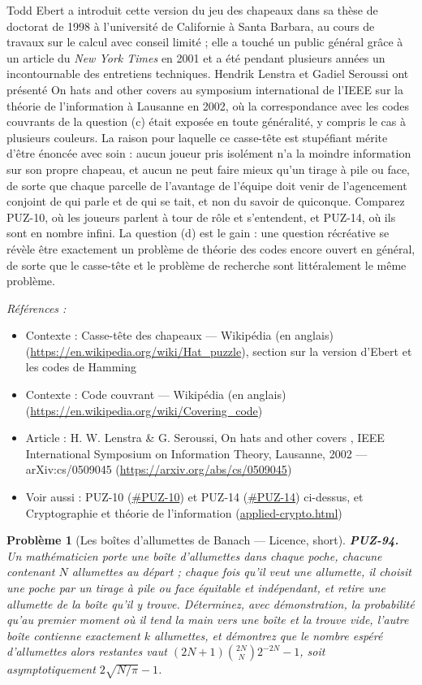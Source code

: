 \documentclass[11pt]{article}
\newtheorem{problem}{Problème}
\newenvironment{refs}{\par\small\noindent\emph{Références :}\begin{itemize}\setlength\itemsep{0pt}}{\end{itemize}\normalsize}
\begin{document}
\noindent Todd Ebert a introduit cette version du jeu des chapeaux dans sa thèse de
doctorat de 1998 à l'université de Californie à Santa Barbara, au cours de travaux sur le
calcul avec conseil limité ; elle a touché un public général grâce à un article du \textit{New
York Times} en 2001 et a été pendant plusieurs années un incontournable des entretiens
techniques. Hendrik Lenstra et Gadiel Seroussi ont présenté \og{} On hats and other covers \fg{} au
symposium international de l'IEEE sur la théorie de l'information à Lausanne en 2002, où la
correspondance avec les codes couvrants de la question (c) était exposée en toute généralité,
y compris le cas à plusieurs couleurs. La raison pour laquelle ce casse-tête est stupéfiant
mérite d'être énoncée avec soin : aucun joueur pris isolément n'a la moindre information sur
son propre chapeau, et aucun ne peut faire mieux qu'un tirage à pile ou face, de sorte que
chaque parcelle de l'avantage de l'équipe doit venir de l'agencement conjoint de qui parle et
de qui se tait, et non du savoir de quiconque. Comparez PUZ-10, où les joueurs parlent à tour
de rôle et s'entendent, et PUZ-14, où ils sont en nombre infini. La question (d) est le
gain : une question récréative se révèle être exactement un problème de théorie des codes
encore ouvert en général, de sorte que le casse-tête et le problème de recherche sont
littéralement le même problème.

\begin{refs}
\item Contexte : Casse-tête des chapeaux --- Wikipédia (en anglais) (\url{https://en.wikipedia.org/wiki/Hat_puzzle}), section sur la version d'Ebert et les codes de Hamming
\item Contexte : Code couvrant --- Wikipédia (en anglais) (\url{https://en.wikipedia.org/wiki/Covering_code})
\item Article : H. W. Lenstra \& G. Seroussi, \og{} On hats and other covers \fg{}, IEEE International Symposium on Information Theory, Lausanne, 2002 --- arXiv:cs/0509045 (\url{https://arxiv.org/abs/cs/0509045})
\item Voir aussi : PUZ-10 (\url{#PUZ-10}) et PUZ-14 (\url{#PUZ-14}) ci-dessus, et Cryptographie et théorie de l'information (\url{applied-crypto.html})
\end{refs}

\bigskip

\begin{problem}[{Les boîtes d'allumettes de Banach --- Licence, short}]
\textbf{PUZ-94.} Un mathématicien porte une boîte d'allumettes dans
chaque poche, chacune contenant $ N $ allumettes au départ ; chaque fois qu'il veut une
allumette, il choisit une poche par un tirage à pile ou face équitable et indépendant, et
retire une allumette de la boîte qu'il y trouve. Déterminez, avec démonstration, la
probabilité qu'au premier moment où il tend la main vers une boîte et la trouve vide, l'autre
boîte contienne exactement $ k $ allumettes, et démontrez que le nombre espéré d'allumettes
alors restantes vaut $ (2N+1)\binom{2N}{N}2^{-2N} - 1 $, soit asymptotiquement
$ 2\sqrt{N/\pi} - 1 $.
\end{problem}
\end{document}
